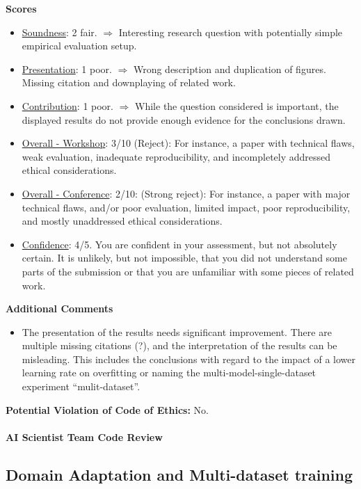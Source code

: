 \textbf{Scores}
\begin{itemize}
    \item \underline{Soundness}: 2 fair. $\Rightarrow$ Interesting research question with potentially simple empirical evaluation setup.
    \item \underline{Presentation}: 1 poor. $\Rightarrow$ Wrong description and duplication of figures. Missing citation and downplaying of related work.
    \item \underline{Contribution}: 1 poor. $\Rightarrow$ While the question considered is important, the displayed results do not provide enough evidence for the conclusions drawn.
    \item \underline{Overall - Workshop}: 3/10 (Reject): For instance, a paper with technical flaws, weak evaluation, inadequate reproducibility, and incompletely addressed ethical considerations.
    \item \underline{Overall - Conference}: 2/10: (Strong reject): For instance, a paper with major technical flaws, and/or poor evaluation, limited impact, poor reproducibility, and mostly unaddressed ethical considerations.
    \item \underline{Confidence}: 4/5. You are confident in your assessment, but not absolutely certain. It is unlikely, but not impossible, that you did not understand some parts of the submission or that you are unfamiliar with some pieces of related work.
\end{itemize}


\textbf{Additional Comments}
\begin{itemize}
    \item The presentation of the results needs significant improvement. There are multiple missing citations (?), and the interpretation of the results can be misleading. This includes the conclusions with regard to the impact of a lower learning rate on overfitting or naming the multi-model-single-dataset experiment ``mulit-dataset''.
\end{itemize}

\textbf{Potential Violation of Code of Ethics:} No.

\newpage

\paragraph{AI Scientist Team Code Review}

\subsection*{Domain Adaptation and Multi-dataset training}

